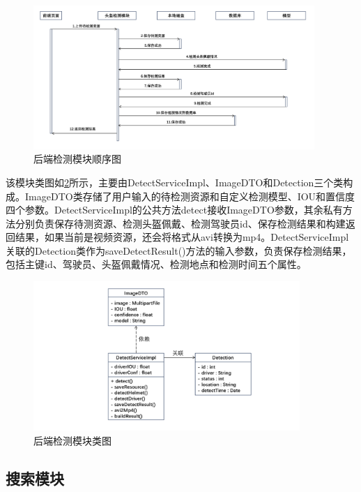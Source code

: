 \begin{figure}[!htb]
    \centering
    \includegraphics[width=0.95\textwidth]{figs/chap05/seq3.png}
    \caption{后端检测模块顺序图}
    \label{fig:seq3}
\end{figure}

该模块类图如\ref{fig:class1}所示，主要由DetectServiceImpl、ImageDTO和Detection三个类构成。ImageDTO类存储了用户输入的待检测资源和自定义检测模型、IOU和置信度四个参数。DetectServiceImpl的公共方法detect接收ImageDTO参数，其余私有方法分别负责保存待测资源、检测头盔佩戴、检测驾驶员id、保存检测结果和构建返回结果，如果当前是视频资源，还会将格式从avi转换为mp4。DetectServiceImpl关联的Detection类作为saveDetectResult()方法的输入参数，负责保存检测结果，包括主键id、驾驶员、头盔佩戴情况、检测地点和检测时间五个属性。

\begin{figure}[!htb]
    \centering
    \includegraphics[width=0.9\textwidth]{figs/chap05/class1.png}
    \caption{后端检测模块类图}
    \label{fig:class1}
\end{figure}

\subsection{搜索模块}

